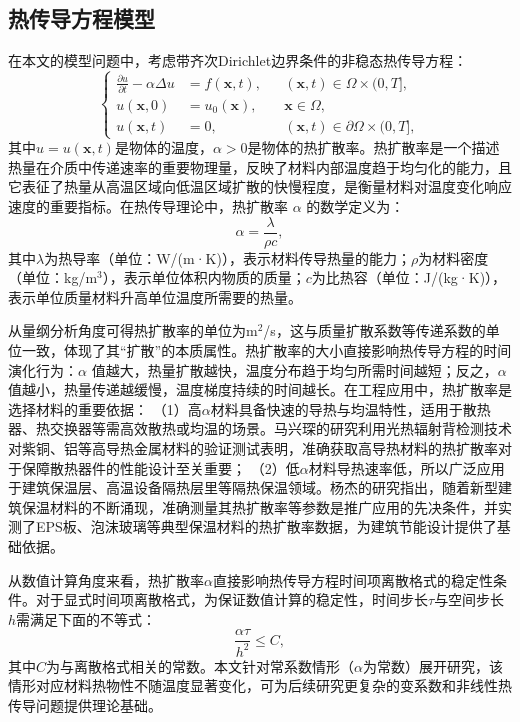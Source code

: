 \documentclass{GZUbachelorthesis}
\theoremstyle{chineseplain}
\begin{document}
\subsection{热传导方程模型}
在本文的模型问题中，考虑带齐次Dirichlet边界条件的非稳态热传导方程：
\begin{equation}
	\label{eq:heat-conduction-model}
	\left\{
	\begin{aligned}
		\frac{\partial u}{\partial t} - \alpha \Delta u &= f(\boldsymbol{x},t), && (\boldsymbol{x},t) \in \Omega \times (0,T], \\
		u(\boldsymbol{x},0) &= u_0(\boldsymbol{x}), && \boldsymbol{x} \in \Omega, \\
     	u(\boldsymbol{x},t) &= 0, && (\boldsymbol{x},t) \in \partial\Omega \times (0,T],
	\end{aligned}
	\right.
\end{equation}
其中$u=u(\boldsymbol{x},t)$是物体的温度，$\alpha>0$是物体的热扩散率。热扩散率是一个描述热量在介质中传递速率的重要物理量\cite{mojumder2023efficient}，反映了材料内部温度趋于均匀化的能力，且它表征了热量从高温区域向低温区域扩散的快慢程度，是衡量材料对温度变化响应速度的重要指标。在热传导理论中，热扩散率 $\alpha$ 的数学定义为：
\begin{equation}
	\label{eq:thermal-diffusivity}
	\alpha = \frac{\lambda}{\rho c},
\end{equation}
其中$\lambda$为热导率（单位：W/(m·K)），表示材料传导热量的能力；$\rho$为材料密度（单位：kg/m$^3$），表示单位体积内物质的质量；$c$为比热容（单位：J/(kg·K)），表示单位质量材料升高单位温度所需要的热量。

从量纲分析角度可得热扩散率的单位为m$^2$/s，这与质量扩散系数等传递系数的单位一致，体现了其“扩散”的本质属性。热扩散率的大小直接影响热传导方程的时间演化行为：$\alpha$ 值越大，热量扩散越快，温度分布趋于均匀所需时间越短；反之，$\alpha$ 值越小，热量传递越缓慢，温度梯度持续的时间越长。在工程应用中，热扩散率是选择材料的重要依据：
（1）高$\alpha$材料具备快速的导热与均温特性，适用于散热器、热交换器等需高效散热或均温的场景。马兴琛的研究利用光热辐射背检测技术对紫铜、铝等高导热金属材料的验证测试表明，准确获取高导热材料的热扩散率对于保障散热器件的性能设计至关重要\cite{Ma2013}；
（2）低$\alpha$材料导热速率低，所以广泛应用于建筑保温层、高温设备隔热层里等隔热保温领域。杨杰的研究指出，随着新型建筑保温材料的不断涌现，准确测量其热扩散率等参数是推广应用的先决条件，并实测了EPS板、泡沫玻璃等典型保温材料的热扩散率数据，为建筑节能设计提供了基础依据\cite{Yang2014}。


从数值计算角度来看，热扩散率$\alpha$直接影响热传导方程时间项离散格式的稳定性条件。对于显式时间项离散格式，为保证数值计算的稳定性，时间步长$\tau$与空间步长$h$需满足下面的不等式：
\[
\frac{\alpha \tau}{h^2} \leq C,
\]
其中$C$为与离散格式相关的常数。本文针对常系数情形（$\alpha$为常数）展开研究，该情形对应材料热物性不随温度显著变化，可为后续研究更复杂的变系数和非线性热传导问题提供理论基础。
\end{document}
